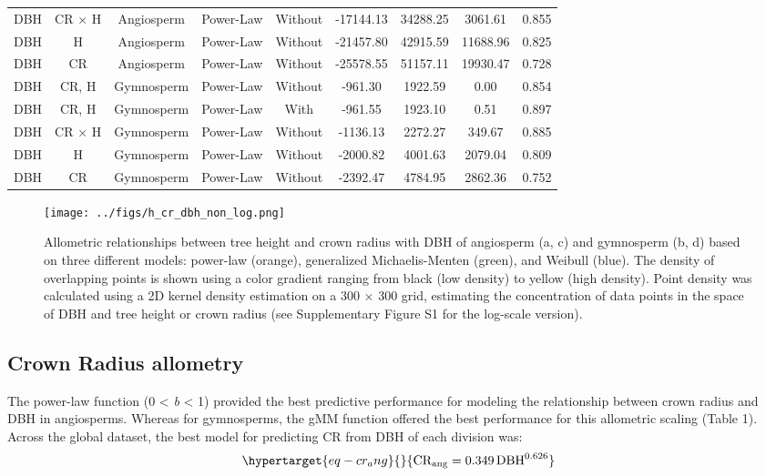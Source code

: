 \documentclass[
  12pt,
  letterpaper,
  DIV=11,
  numbers=noendperiod]{scrartcl}
\begin{document}
\begin{longtable*}[t]{ccccccccc}
DBH & CR × H & Angiosperm & Power-Law & Without & -17144.13 & 34288.25 & 3061.61 & 0.855\\
DBH & H & Angiosperm & Power-Law & Without & -21457.80 & 42915.59 & 11688.96 & 0.825\\
\addlinespace
DBH & CR & Angiosperm & Power-Law & Without & -25578.55 & 51157.11 & 19930.47 & 0.728\\
DBH & CR, H & Gymnosperm & Power-Law & Without & -961.30 & 1922.59 & 0.00 & 0.854\\
DBH & CR, H & Gymnosperm & Power-Law & With & -961.55 & 1923.10 & 0.51 & 0.897\\
DBH & CR × H & Gymnosperm & Power-Law & Without & -1136.13 & 2272.27 & 349.67 & 0.885\\
DBH & H & Gymnosperm & Power-Law & Without & -2000.82 & 4001.63 & 2079.04 & 0.809\\
\addlinespace
DBH & CR & Gymnosperm & Power-Law & Without & -2392.47 & 4784.95 & 2862.36 & 0.752\\
\bottomrule
\end{longtable*}
\endgroup{}

\newpage

\begin{figure}

{\centering \texttt{[image: ../figs/h\_cr\_dbh\_non\_log.png]}

}

\caption{\label{fig-compare}Allometric relationships between tree height
and crown radius with DBH of angiosperm (a, c) and gymnosperm (b, d)
based on three different models: power-law (orange), generalized
Michaelis-Menten (green), and Weibull (blue). The density of overlapping
points is shown using a color gradient ranging from black (low density)
to yellow (high density). Point density was calculated using a 2D kernel
density estimation on a 300 \(\times\) 300 grid, estimating the
concentration of data points in the space of DBH and tree height or
crown radius (see Supplementary Figure S1 for the log-scale version).}

\end{figure}

\hypertarget{crown-radius-allometry}{%
\subsection{Crown Radius allometry}\label{crown-radius-allometry}}

The power-law function (0 \textless{} \emph{b} \textless{} 1) provided
the best predictive performance for modeling the relationship between
crown radius and DBH in angiosperms. Whereas for gymnosperms, the gMM
function offered the best performance for this allometric scaling (Table
1). Across the global dataset, the best model for predicting CR from DBH
of each division was: \begin{equation}\protect\hypertarget{eq-cr_ang}{}{
\mathrm{CR_{ang}} = \mathrm{0.349}
\, \mathrm{DBH}^{\mathrm{0.626}}
}\label{eq-cr_ang}\end{equation}
\end{document}

